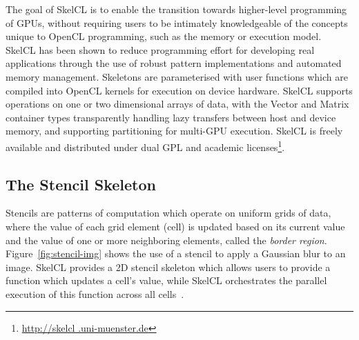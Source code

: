 \documentclass[nonatbib,preprint,nocopyrightspace,9pt]{sigplanconf}
\begin{document}
The goal of SkelCL is to enable the transition towards higher-level programming
of GPUs, without requiring users to be intimately knowledgeable of the concepts
unique to OpenCL programming, such as the memory or execution model. SkelCL has
been shown to reduce programming effort for developing real applications through
the use of robust pattern implementations and automated memory management.
Skeletons are parameterised with user functions which are compiled into OpenCL
kernels for execution on device hardware. SkelCL supports operations on one or
two dimensional arrays of data, with the Vector and Matrix container types
transparently handling lazy transfers between host and device memory, and
supporting partitioning for multi-GPU execution. SkelCL is freely available and
distributed under dual GPL and academic licenses\footnote{\url{http://skelcl
.uni-muenster.de}}.

\subsection{The Stencil Skeleton}

Stencils are patterns of computation which operate on uniform grids of data,
where the value of each grid element (cell) is updated based on its current
value and the value of one or more neighboring elements, called the \emph{border
region}. Figure~\ref{fig:stencil-img} shows the use of a stencil to apply a
Gaussian blur to an image. SkelCL provides a 2D stencil skeleton which allows
users to provide a function which updates a cell's value, while SkelCL
orchestrates the parallel execution of this function across all
cells~\cite{Steuwer2014a}.
\end{document}

